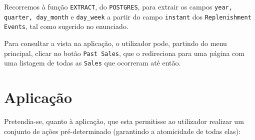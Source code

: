 \documentclass[12pt,a4paper]{article}
\begin{document}
  

  Recorremos à função \texttt{EXTRACT}, do \texttt{POSTGRES}, para extrair os campos \texttt{year, 
  quarter, day\_month} e \texttt{day\_week} a partir do campo \texttt{instant} dos
  \texttt{Replenishment Events}, tal como sugerido no enunciado.

  Para consultar a vista na aplicação, o utilizador pode, partindo do menu principal,
  clicar no botão \texttt{Past Sales}, que o redireciona para uma página com uma
  listagem de todas as \texttt{Sales} que ocorreram até então.

  \section*{Aplicação}


  Pretendia-se, quanto à aplicação, que esta permitisse ao utilizador realizar um conjunto
  de ações pré-determinado (garantindo a atomicidade de todas elas):
\end{document}
